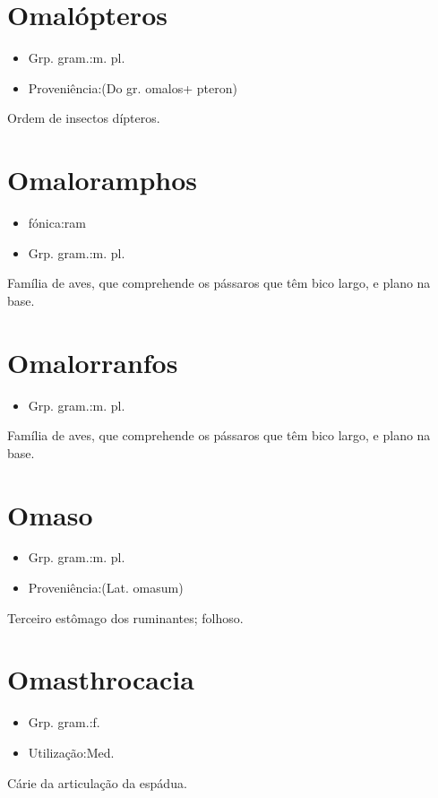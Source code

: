 \section{Omalópteros}
\begin{itemize}
\item {Grp. gram.:m. pl.}
\end{itemize}
\begin{itemize}
\item {Proveniência:(Do gr. \textunderscore omalos\textunderscore  + \textunderscore pteron\textunderscore )}
\end{itemize}
Ordem de insectos dípteros.
\section{Omaloramphos}
\begin{itemize}
\item {fónica:ram}
\end{itemize}
\begin{itemize}
\item {Grp. gram.:m. pl.}
\end{itemize}
Família de aves, que comprehende os pássaros que têm bico largo, e plano na base.
\section{Omalorranfos}
\begin{itemize}
\item {Grp. gram.:m. pl.}
\end{itemize}
Família de aves, que comprehende os pássaros que têm bico largo, e plano na base.
\section{Omaso}
\begin{itemize}
\item {Grp. gram.:m. pl.}
\end{itemize}
\begin{itemize}
\item {Proveniência:(Lat. \textunderscore omasum\textunderscore )}
\end{itemize}
Terceiro estômago dos ruminantes; folhoso.
\section{Omasthrocacia}
\begin{itemize}
\item {Grp. gram.:f.}
\end{itemize}
\begin{itemize}
\item {Utilização:Med.}
\end{itemize}
Cárie da articulação da espádua.
